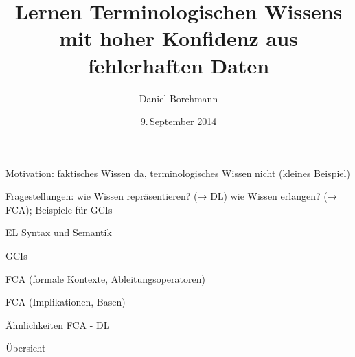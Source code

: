 \documentclass[ngerman]{beamer}
\title{Lernen Terminologischen Wissens\\ mit hoher Konfidenz aus fehlerhaften Daten}
\author{Daniel Borchmann}
\date{9.\,September 2014}
\begin{document}
\begin{frame}[plain]
  \maketitle
\end{frame}

\begin{frame}
  Motivation: faktisches Wissen da, terminologisches Wissen nicht (kleines Beispiel)
\end{frame}

\begin{frame}
  Fragestellungen: wie Wissen repräsentieren? (→ DL) wie Wissen erlangen? (→ FCA);
  Beispiele für GCIs
\end{frame}

\begin{frame}
  EL Syntax und Semantik
\end{frame}

\begin{frame}
  GCIs
\end{frame}

\begin{frame}
  FCA (formale Kontexte, Ableitungsoperatoren)
\end{frame}

\begin{frame}
  FCA (Implikationen, Basen)
\end{frame}

\begin{frame}
  Ähnlichkeiten FCA - DL
\end{frame}

\begin{frame}
  Übersicht
\end{frame}
\end{document}
